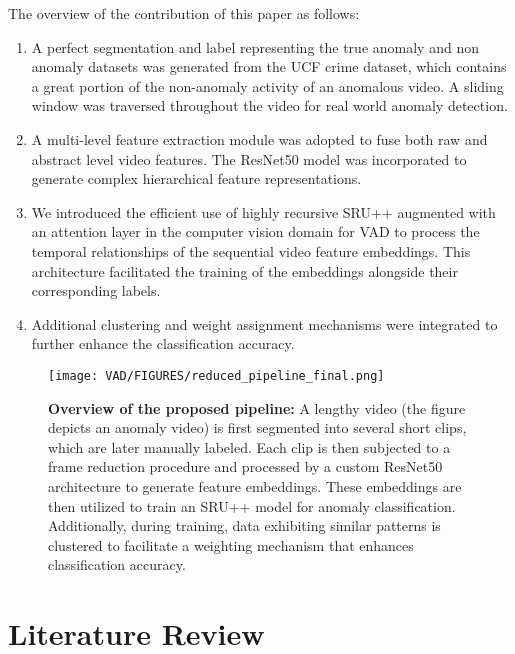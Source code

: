\documentclass[runningheads]{llncs}
\begin{document}
\noindent
The overview of the contribution of this paper as follows:

\begin{enumerate}

\item A perfect segmentation and label representing the true anomaly and non anomaly datasets was generated from the UCF crime dataset, which contains a great portion of the non-anomaly activity of an anomalous video. A sliding window was traversed throughout the video for real world anomaly detection.

\item A multi-level feature extraction module was adopted to fuse both raw and abstract level video features. The ResNet50 model was incorporated to generate complex hierarchical feature representations.

\item We introduced the efficient use of highly recursive SRU++ augmented with an attention layer in the computer vision domain for VAD to process the temporal relationships of the sequential video feature embeddings. This architecture facilitated the training of the embeddings alongside their corresponding labels.

\item Additional clustering and weight assignment mechanisms were integrated to further enhance the classification accuracy.

\end{enumerate}

\begin{figure}
\centering
\texttt{[image: VAD/FIGURES/reduced\_pipeline\_final.png]}
\caption{\textbf{Overview of the proposed pipeline:} A lengthy video (the figure depicts an anomaly video) is first  segmented into several short clips, which are later manually labeled. Each clip is then subjected to a frame reduction procedure and processed by a custom ResNet50 architecture to generate feature embeddings. These embeddings are then utilized to train an SRU++ model for anomaly classification. Additionally, during training, data exhibiting similar patterns is clustered to facilitate a weighting mechanism that enhances classification accuracy.} \label{fig1}
\end{figure}

\section{Literature Review}
\end{document}
